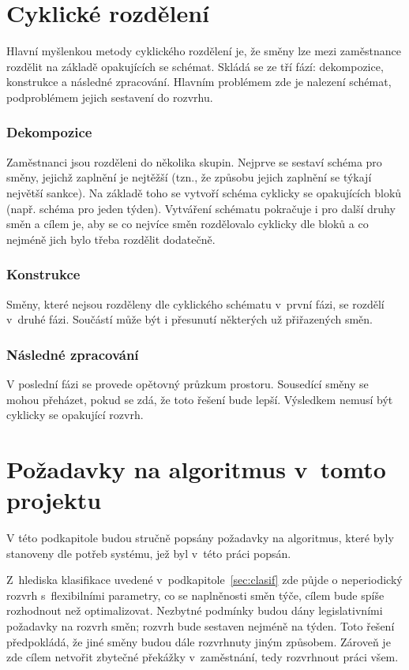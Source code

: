 \documentclass[twoside]{ctuthesis}
\begin{document}
\section{Cyklické rozdělení}
Hlavní myšlenkou metody cyklického rozdělení je, že směny lze mezi zaměstnance rozdělit na základě opakujících se schémat. Skládá se ze tří fází: dekompozice, konstrukce a následné zpracování. \cite{brucker2005decomposition} Hlavním problémem zde je nalezení schémat, podproblémem jejich sestavení do rozvrhu. \cite{becker2020decomposition}

\subsubsection{Dekompozice}
Zaměstnanci jsou rozděleni do několika skupin. Nejprve se sestaví schéma pro směny, jejichž zaplnění je nejtěžší (tzn., že způsobu jejich zaplnění se týkají největší sankce). Na základě toho se vytvoří schéma cyklicky se opakujících bloků (např. schéma pro jeden týden). Vytváření schématu pokračuje i pro další druhy směn a cílem je, aby se co nejvíce směn rozdělovalo cyklicky dle bloků a co nejméně jich bylo třeba rozdělit dodatečně.

\subsubsection{Konstrukce}
Směny, které nejsou rozděleny dle cyklického schématu v~první fázi, se rozdělí v~druhé fázi. Součástí může být i přesunutí některých už přiřazených směn.

\subsubsection{Následné zpracování}
V poslední fázi se provede opětovný průzkum prostoru. Sousedící směny se mohou přeházet, pokud se zdá, že toto řešení bude lepší. Výsledkem nemusí být cyklicky se opakující rozvrh.

\newpage

\section{Požadavky na algoritmus v~tomto projektu}

V této podkapitole budou stručně popsány požadavky na algoritmus, které byly stanoveny dle potřeb systému, jež byl v~této práci popsán.

Z~hlediska klasifikace uvedené v~podkapitole~\ref{sec:clasif} zde půjde o neperiodický rozvrh s~flexibilními parametry, co se naplněnosti směn týče, cílem bude spíše rozhodnout než optimalizovat. Nezbytné podmínky budou dány legislativními požadavky na rozvrh směn; rozvrh bude sestaven nejméně na týden. Toto řešení předpokládá, že jiné směny budou dále rozvrhnuty jiným způsobem. Zároveň je zde cílem netvořit zbytečné překážky v~zaměstnání, tedy rozvrhnout práci všem.
\end{document}
